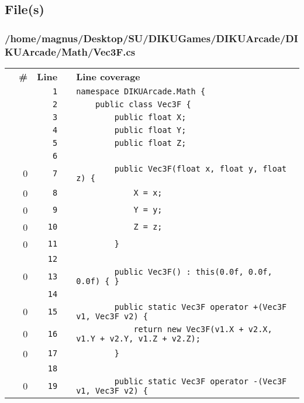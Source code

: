 \documentclass[a4paper,landscape,10pt]{article}
\begin{document}
\subsection{File(s)}
\subsubsection{/home/magnus/Desktop/SU/DIKUGames/DIKUArcade/DIKUArcade/Math/Vec3F.cs}
\begin{longtable}[l]{lrrll}
\textbf{} & \textbf{\#} & \textbf{Line} & \textbf{} & \textbf{Line coverage}\\
\cellcolor{gray} &  & \verb~1~ & & \verb~namespace DIKUArcade.Math {~\\
\cellcolor{gray} &  & \verb~2~ & & \verb~    public class Vec3F {~\\
\cellcolor{gray} &  & \verb~3~ & & \verb~        public float X;~\\
\cellcolor{gray} &  & \verb~4~ & & \verb~        public float Y;~\\
\cellcolor{gray} &  & \verb~5~ & & \verb~        public float Z;~\\
\cellcolor{gray} &  & \verb~6~ & & \verb~~\\
\cellcolor{red} & 0 & \verb~7~ & & \verb~        public Vec3F(float x, float y, float z) {~\\
\cellcolor{red} & 0 & \verb~8~ & & \verb~            X = x;~\\
\cellcolor{red} & 0 & \verb~9~ & & \verb~            Y = y;~\\
\cellcolor{red} & 0 & \verb~10~ & & \verb~            Z = z;~\\
\cellcolor{red} & 0 & \verb~11~ & & \verb~        }~\\
\cellcolor{gray} &  & \verb~12~ & & \verb~~\\
\cellcolor{red} & 0 & \verb~13~ & & \verb~        public Vec3F() : this(0.0f, 0.0f, 0.0f) { }~\\
\cellcolor{gray} &  & \verb~14~ & & \verb~~\\
\cellcolor{red} & 0 & \verb~15~ & & \verb~        public static Vec3F operator +(Vec3F v1, Vec3F v2) {~\\
\cellcolor{red} & 0 & \verb~16~ & & \verb~            return new Vec3F(v1.X + v2.X, v1.Y + v2.Y, v1.Z + v2.Z);~\\
\cellcolor{red} & 0 & \verb~17~ & & \verb~        }~\\
\cellcolor{gray} &  & \verb~18~ & & \verb~~\\
\cellcolor{red} & 0 & \verb~19~ & & \verb~        public static Vec3F operator -(Vec3F v1, Vec3F v2) {~\\

\end{longtable}
\end{document}
